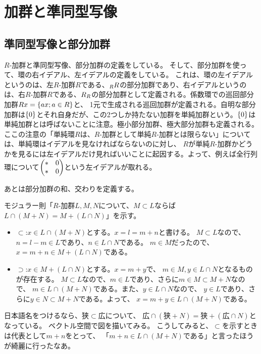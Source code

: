 \documentclass[9pt]{ltjsarticle}
\begin{document}
\section{加群と準同型写像}
\label{sec:加群と準同型写像}
\subsection{準同型写像と部分加群}
\label{sub:準同型写像と部分加群}
$R$-加群と準同型写像、部分加群の定義をしている。
そして、部分加群を使って、環の右イデアル、左イデアルの定義をしている。
これは、環の左イデアルというのは、左$R$-加群$R$である、${}_{R}R$の部分加群であり、右イデアルというのは、右$R$-加群$R$である、$R{}_{R}$の部分加群として定義される。係数環での巡回部分加群$Rx = \left\{ax ; a\in R\right\}$と、
1元で生成される巡回加群が定義される。自明な部分加群は$\left\{0\right\}$とそれ自身だが、この2つしか持たない加群を単純加群という。$\{0\}$は単純加群とは呼ばないことに注意。極小部分加群、極大部分加群も定義される。
ここの注意の「単純環$R$は、$R$-加群として単純$R$-加群とは限らない」については、単純環はイデアルを見なければならないのに対し、
$R$が単純$R$-加群かどうかを見るには左イデアルだけ見ればいいことに起因する。よって、例えば全行列環について$\left(\begin{matrix} * & 0 \\ * & 0 \end{matrix}\right)$という左イデアルが取れる。

あとは部分加群の和、交わりを定義する。

モジュラー則「$R$-加群$L,M,N$について、$M\subset L$ならば$L\cap (M+N) = M + (L\cap N)$」を示す。
\begin{myproof}
  \begin{itemize}
    \item $\subset$:$x \in L\cap (M+N)$とする。$x=l=m+n$と書ける。
    $M\subset L$なので、$n=l-m \in L$であり、$n \in L\cap N$である。
    $m \in M$だったので、$x = m+n \in M+(L\cap N)$である。
    \item $\supset$:$x\in M+(L\cap N)$とする。$x=m+y$で、
    $m\in M,y \in L\cap N$となるものが存在する。
    $M\subset L$なので、$m\in L$であり、さらに$m\in M \subset M+N$なので、
    $m\in L\cap (M+N)$である。また、$y\in L\cap N$なので、
    $y\in L$であり、さらに$y\in N \subset M+N$である。よって、
    $x=m+y \in L\cap (M+N)$である。
  \end{itemize}
\end{myproof}
日本語名をつけるなら、$狭 \subset 広$について、
$広 \cap (狭 + N) = 狭 + (広 \cap N)$となっている。
ベクトル空間で図を描いてみる。
こうしてみると、$\subset$を示すときは代表として$m+n$をとって、
「$m+n \in L\cap (M+N)$である」と言ったほうが綺麗に行ったなあ。
\end{document}
